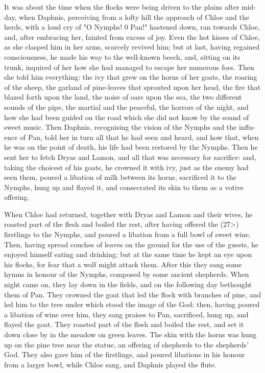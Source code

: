 \documentclass{book}
\begin{document}
\begin{pairs}
\begin{Rightside}
\begin{english}
  It was about the time when the flocks were being driven to the plains after mid-day, when Daphnis, perceiving from a lofty hill the approach of Chloe and the herds, with a loud cry of "O Nymphs! 0 Pan!" hastened down, ran towards Chloe, and, after embracing her, fainted from excess of joy.  Even the hot kisses of Chloe, as she clasped him in her arms, scarcely revived him; but at last, having regained consciousness, he made his way to the well-known beech, and, sitting on its trunk, inquired of her how she had managed to escape her numerous foes.  Then she told him everything: the ivy that grew on the horns of her goats, the roaring of the sheep, the garland of pine-leaves that sprouted upon her head, the fire that blazed forth upon the land, the noise of oars upon the sea, the two different sounds of the pipe, the martial and the peaceful, the horrors of the night, and how she had been guided on the road which she did not know by the sound of sweet music.  Then Daphnis, recognising the vision of the Nymphs and the influence of Pan, told her in turn all that he had seen and  heard, and how that, when he was on the point of death, his life had been restored by the Nymphs.  Then he sent her to fetch Dryas and Lamon, and all that was necessary for sacrifice: and, taking the choicest of his goats, he crowned it with ivy, just as the enemy had seen them, poured a libation of milk between its horns, sacrificed it to the Nymphs, hung up and flayed it, and consecrated its skin to them as a votive offering.
\pend


  When Chloe had returned, together with Dryas and Lamon and their wives, he roasted part of the flesh and boiled the rest, after having offered the (27>) firstlings to the Nymphs, and poured a libation from a full bowl of sweet wine.  Then, having spread couches of leaves on the ground for the use of the guests, he enjoyed himself eating and drinking; but at the same time he kept an eye upon his flocks, for fear that a wolf might attack them.  After this they sang some hymns in honour of the Nymphs, composed by some ancient shepherds.  When night came on, they lay down in the fields, and on the following day bethought them of Pan.  They crowned the goat that led the flock with branches of pine, and led him to the tree under which stood the image of the God: then, having poured a libation of wine over him, they sang praises to Pan, sacrificed, hung up, and flayed the goat.  They roasted part of the flesh and boiled the rest, and set it down close by in the meadow on green leaves.  The skin with the horns was hung up on the pine tree near the statue, an offering of shepherds to the shepherds' God.  They also gave him of the firstlings, and poured libations in his honour from a larger bowl, while Chloe sang, and Daphnis played the flute.
\pend



\end{english}
\end{Rightside}
\end{pairs}
\end{document}
